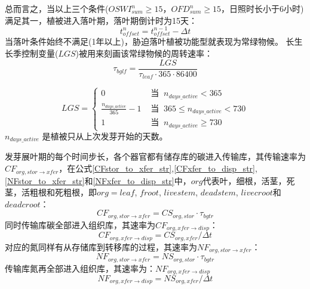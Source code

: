 总而言之，当以上三个条件($OSWI_{sum}^n\geqslant 15$，$OFD_{sum}^n\geqslant 15$，日照时长小于6小时)满足其一，植被进入落叶期，落叶期倒计时为15天：
\begin{equation}
t_{offset}^{n}=t_{offset}^{n-1}-\Delta t
\end{equation}
当落叶条件始终不满足(1年以上)，胁迫落叶植被功能型就表现为常绿物候。
长生长季控制变量($LGS$)被用来刻画该常绿物候的周转速率：
\begin{equation}
\tau_{b g l f}=\frac{L G S}{\tau_{leaf} \cdot 365 \cdot 86400}
\end{equation}

\begin{equation}
L G S=\begin{cases}
0 &  \text{ 当 }\ n_{ {days}\_{active}}<365 \\ 
\frac{n_{ {days\_{active}}}}{365}-1 &  \text{ 当 }\ 365 \leqslant n_{ {days }\_{active} }<730 \\ 
1 & \text{ 当 }\ n_{ {days}\_{active}} \geqslant 730
\end{cases}
\end{equation}
$n_{days\_{active}}$ 是植被只从上次发芽开始的天数。


发芽展叶期的每个时间步长，各个器官都有储存库的碳进入传输库，其传输速率为$CF_{org,{stor}\rightarrow {xfer}}$，在公式\eqref{CFstor_to_xfer_str},\eqref{CFxfer_to_disp_str},\eqref{NFstor_to_xfer_str}和\eqref{NFxfer_to_disp_str}中，$org$代表叶，细根，活茎，死茎，活粗根和死粗根，即$org=leaf$, $froot$, $livestem$, $deadstem$, $livecroot$和$deadcroot$：
\begin{equation}\label{CFstor_to_xfer_str}
CF_{org,{stor}\rightarrow {xfer}}=CS_{org,{stor} }\cdot \tau_{bgtr}
\end{equation}
同时传输库碳全部进入组织库，其速率为$CF_{org,{xfer} \rightarrow {disp}}$：
\begin{equation}\label{CFxfer_to_disp_str}
  CF_{org,{xfer}\rightarrow {disp}}=CS_{org,{xfer}}/\Delta t
\end{equation}
对应的氮同样有从存储库到转移库的过程，其速率为$NF_{org,{stor}\rightarrow {xfer}}$：
\begin{equation}\label{NFstor_to_xfer_str}
  NF_{org,{stor}\rightarrow {xfer}}=NS_{org,{stor}}\cdot\tau_{bgtr}
\end{equation}
传输库氮再全部进入组织库，其速率为：$NF_{org,{xfer} \rightarrow {disp}}$
\begin{equation}\label{NFxfer_to_disp_str}
  NF_{org,{xfer}\rightarrow {disp}}=NS_{org,{xfer}}/\Delta t
\end{equation}


